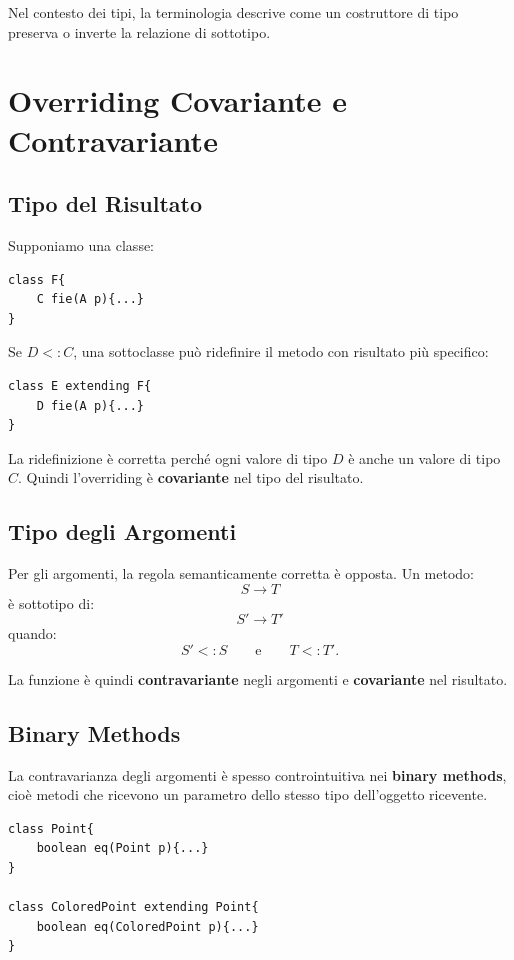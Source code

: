\documentclass{article}
\begin{document}
Nel contesto dei tipi, la terminologia descrive come un costruttore di tipo preserva o inverte la relazione di sottotipo.

\section{Overriding Covariante e Contravariante}

\subsection{Tipo del Risultato}

Supponiamo una classe:

\begin{lstlisting}
class F{
    C fie(A p){...}
}
\end{lstlisting}

Se $D <: C$, una sottoclasse può ridefinire il metodo con risultato più specifico:

\begin{lstlisting}
class E extending F{
    D fie(A p){...}
}
\end{lstlisting}

La ridefinizione è corretta perché ogni valore di tipo $D$ è anche un valore di tipo $C$. Quindi l'overriding è \textbf{covariante} nel tipo del risultato.

\subsection{Tipo degli Argomenti}

Per gli argomenti, la regola semanticamente corretta è opposta. Un metodo:
\[
S \to T
\]
è sottotipo di:
\[
S' \to T'
\]
quando:
\[
S' <: S
\qquad \text{e} \qquad
T <: T'.
\]

La funzione è quindi \textbf{contravariante} negli argomenti e \textbf{covariante} nel risultato.

\subsection{Binary Methods}

La contravarianza degli argomenti è spesso controintuitiva nei \textbf{binary methods}, cioè metodi che ricevono un parametro dello stesso tipo dell'oggetto ricevente.

\begin{lstlisting}
class Point{
    boolean eq(Point p){...}
}

class ColoredPoint extending Point{
    boolean eq(ColoredPoint p){...}
}
\end{lstlisting}
\end{document}
